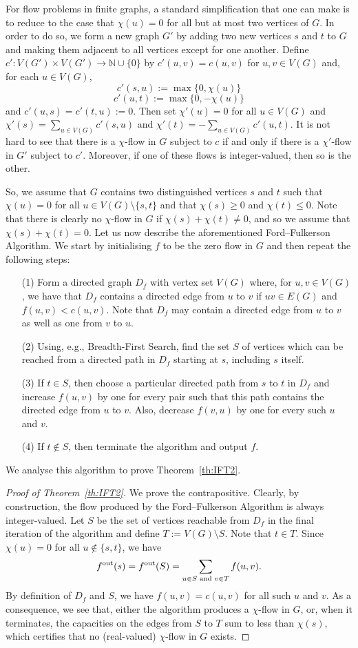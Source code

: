 \documentclass[12pt,a4paper]{amsart}
\numberwithin{equation}{section}
\theoremstyle{definition}
\begin{document}
For flow problems in finite graphs, a standard simplification that one can make is to reduce to the case that $\chi(u)=0$ for all but at most two vertices of $G$. In order to do so, we form a new graph $G'$ by adding two new vertices $s$ and $t$ to $G$ and making them adjacent to all vertices except for one another. Define $c':V(G')\times V(G')\to\mathbb{N}\cup\{0\}$ by $c'(u,v)=c(u,v)$ for $u,v\in V(G)$ and, for each $u\in V(G)$,
\[c'(s,u):=\max\{0,\chi(u)\}\]
\[c'(u,t):=\max\{0,-\chi(u)\}\]
and $c'(u,s)=c'(t,u):=0$. Then set $\chi'(u)=0$ for all $u\in V(G)$ and $\chi'(s)=\sum_{u\in V(G)}c'(s,u)$ and $\chi'(t)=-\sum_{u\in V(G)}c'(u,t)$. It is not hard to see that there is a  $\chi$-flow in $G$ subject to $c$ if and only if there is a $\chi'$-flow in $G'$ subject to $c'$. Moreover, if one of these flows is integer-valued, then so is the other. 

So, we assume that $G$ contains two distinguished vertices $s$ and $t$ such that $\chi(u)=0$ for all $u\in V(G)\setminus\{s,t\}$ and that $\chi(s)\geq 0$ and $\chi(t)\leq 0$. Note that there is clearly no $\chi$-flow in $G$ if $\chi(s)+\chi(t)\neq0$, and so we assume that $\chi(s)+\chi(t)=0$. Let us now describe the aforementioned Ford--Fulkerson Algorithm. We start by initialising $f$ to be the zero flow in $G$ and then repeat the following steps:
\begin{itemize}
\item[(1)] Form a directed graph $D_f$ with vertex set $V(G)$ where, for $u,v\in V(G)$, we have that $D_f$ contains a directed edge from $u$ to $v$ if $uv\in E(G)$ and $f(u,v)<c(u,v)$. Note that $D_f$ may contain a directed edge from $u$ to $v$ as well as one from $v$ to $u$.
\item[(2)] Using, e.g., Breadth-First Search, find the set $S$ of vertices which can be reached from a directed path in $D_f$ starting at $s$, including $s$ itself.
\item[(3)] If $t\in S$, then choose a particular directed path from $s$ to $t$ in $D_f$ and increase $f(u,v)$ by one for every pair such that this path contains the directed edge from $u$ to $v$. Also, decrease $f(v,u)$ by one for every such $u$ and $v$.
\item[(4)] If $t\notin S$, then terminate the algorithm and output $f$. 
\end{itemize}
We analyse this algorithm to prove Theorem~\ref{th:IFT2}.

\begin{proof}[Proof of Theorem~\ref{th:IFT2}]
We prove the contrapositive. Clearly, by construction, the flow produced by the Ford--Fulkerson Algorithm is always integer-valued. Let $S$ be the set of vertices reachable from $D_f$ in the final iteration of the algorithm and define $T:=V(G)\setminus S$. Note that $t\in T$. Since $\chi(u)=0$ for all $u\notin \{s,t\}$, we have
\[f^{\operatorname{out}}(s) = f^{\operatorname{out}}(S) = \sum_{u\in S\text{ and }v\in T}f(u,v).\]
By definition of $D_f$ and $S$, we have $f(u,v)=c(u,v)$ for all such $u$ and $v$. As a consequence, we see that, either the algorithm produces a $\chi$-flow in $G$, or, when it terminates, the capacities on the edges from $S$ to $T$ sum to less than $\chi(s)$, which certifies that no (real-valued) $\chi$-flow in $G$ exists.
\end{proof} 
\end{document}
